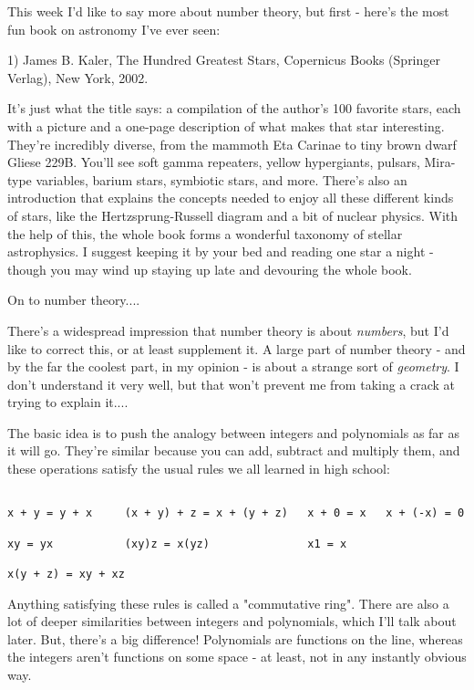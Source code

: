 



This week I'd like to say more about number theory, but first - 
here's the most fun book on astronomy I've ever seen:

1) James B. Kaler, The Hundred Greatest Stars, Copernicus Books
(Springer Verlag), New York, 2002.

It's just what the title says: a compilation of the author's 100
favorite stars, each with a picture and a one-page description of what 
makes that star interesting.  They're incredibly diverse, from the 
mammoth Eta Carinae to tiny brown dwarf Gliese 229B.  You'll see soft 
gamma repeaters, yellow hypergiants, pulsars, Mira-type variables, 
barium stars, symbiotic stars, and more.  There's also an introduction 
that explains the concepts needed to enjoy all these different kinds of 
stars, like the Hertzsprung-Russell diagram and a bit of nuclear physics.  
With the help of this, the whole book forms a wonderful taxonomy of 
stellar astrophysics.  I suggest keeping it by your bed and reading one 
star a night - though you may wind up staying up late and devouring the 
whole book.

On to number theory....

There's a widespread impression that number theory is about \emph{numbers}, 
but I'd like to correct this, or at least supplement it.  A large part 
of number theory - and by the far the coolest part, in my opinion - is 
about a strange sort of \emph{geometry}.  I don't understand it very well, 
but that won't prevent me from taking a crack at trying to explain it....

The basic idea is to push the analogy between integers and polynomials 
as far as it will go.  They're similar because you can add, subtract and
multiply them, and these operations satisfy the usual rules we all 
learned in high school:


\begin{verbatim}

x + y = y + x     (x + y) + z = x + (y + z)   x + 0 = x   x + (-x) = 0

xy = yx           (xy)z = x(yz)               x1 = x

x(y + z) = xy + xz
\end{verbatim}
    

Anything satisfying these rules is called a "commutative ring".
There are also a lot of deeper similarities between integers and
polynomials, which I'll talk about later.  But, there's a big difference!  
Polynomials are functions on the line, whereas the integers aren't 
functions on some space - at least, not in any instantly obvious way.  

